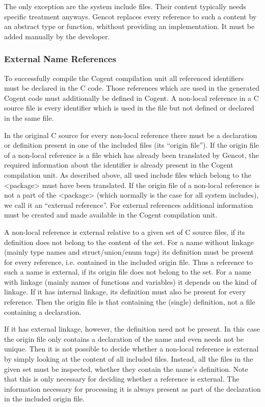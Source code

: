 The only exception are the system include files. Their content typically needs specific treatment anyways. Gencot replaces every 
reference to such a content by an abstract type or function, whithout providing an implementation. It must be added manually
by the developer.

\subsubsection{External Name References}
\label{design-modular-extref}

To successfully compile the Cogent compilation unit all referenced identifiers must be declared in the C code. 
Those references which are
used in the generated Cogent code must additionally be defined in Cogent. A non-local reference in a C source file is every
identifier which is used in the file but not defined or declared in the same file.

In the original C source for every non-local reference there must be a declaration or definition present in one of the included
files (its ``origin file''). If the origin file of a non-local reference is a file which has already been translated by 
Gencot, the required information about the identifier is already present in the Cogent compilation unit. As described above, 
all used include files which belong to the <package> must have been translated. If the origin file
of a non-local reference is not a part of the <package> (which normally is the case for all
system includes), we call it an ``external reference''. For external references additional information must be created and 
made available in the Cogent compilation unit.

A non-local reference is external relative to a given set of C source files, if its definition does not belong to the content
of the set. For a name without linkage (mainly type names and struct/union/enum tags) its definition must be present for every
reference, i.e. contained in the included origin file. Thus a reference to such a name is external, if its origin file does 
not belong to the set. For a name with linkage (mainly names of functions and variables) it depends on the kind of linkage.
If it has internal linkage, its definition must also be present for every reference. Then the origin file is that containing the
(single) definition, not a file containing a declaration. 

If it has external linkage, however, the definition need not be present. In this case the origin file only contains a declaration
of the name and even needs not be unique. Then it is not possible to decide whether a non-local reference is external by simply 
looking at the content of all included files. Instead, all the files in the given set must be inspected, whether they contain
the name's definition. Note that this is only necessary for deciding whether a reference is external. The information necessary
for processing it is always present as part of the declaration in the included origin file.

